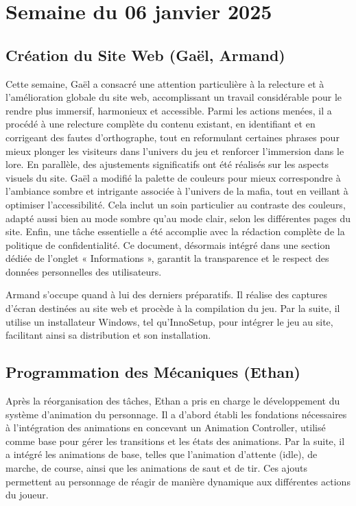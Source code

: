 \documentclass{report}
\begin{document}
\newpage
\section{Semaine du 06 janvier 2025}

\subsection*{Création du Site Web (Gaël, Armand)}
Cette semaine, Gaël a consacré une attention particulière à la relecture et à l’amélioration globale du site web, accomplissant un travail considérable pour le rendre plus immersif, harmonieux et accessible. Parmi les actions menées, il a procédé à une relecture complète du contenu existant, en identifiant et en corrigeant des fautes d’orthographe, tout en reformulant certaines phrases pour mieux plonger les visiteurs dans l’univers du jeu et renforcer l’immersion dans le lore. En parallèle, des ajustements significatifs ont été réalisés sur les aspects visuels du site. Gaël a modifié la palette de couleurs pour mieux correspondre à l’ambiance sombre et intrigante associée à l’univers de la mafia, tout en veillant à optimiser l’accessibilité. Cela inclut un soin particulier au contraste des couleurs, adapté aussi bien au mode sombre qu’au mode clair, selon les différentes pages du site. Enfin, une tâche essentielle a été accomplie avec la rédaction complète de la politique de confidentialité. Ce document, désormais intégré dans une section dédiée de l’onglet « Informations », garantit la transparence et le respect des données personnelles des utilisateurs.

Armand s'occupe quand à lui des derniers préparatifs. Il réalise des captures d’écran destinées au site web et procède à la compilation du jeu. Par la suite, il utilise un installateur Windows, tel qu’InnoSetup, pour intégrer le jeu au site, facilitant ainsi sa distribution et son installation.

\subsection*{Programmation des Mécaniques (Ethan)}
Après la réorganisation des tâches, Ethan a pris en charge le développement du système d'animation du personnage. Il a d'abord établi les fondations nécessaires à l'intégration des animations en concevant un Animation Controller, utilisé comme base pour gérer les transitions et les états des animations. Par la suite, il a intégré les animations de base, telles que l’animation d’attente (idle), de marche, de course, ainsi que les animations de saut et de tir. Ces ajouts permettent au personnage de réagir de manière dynamique aux différentes actions du joueur.
\end{document}
